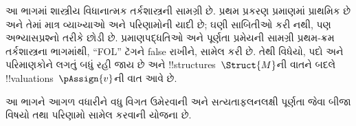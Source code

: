 \documentclass[../../include/open-logic-part]{subfiles}
\begin{document}

\begin{editorial}
  આ ભાગમાં શાસ્ત્રીય વિધાનાત્મક તર્કશાસ્ત્રની સામગ્રી છે. પ્રથમ પ્રકરણ
  પ્રમાણમાં પ્રાથમિક છે અને તેમાં માત્ર વ્યાખ્યાઓ અને પરિણામોની યાદી છે;
  ઘણી સાબિતીઓ કરી નથી, પણ અભ્યાસપ્રશ્નો તરીકે છોડી છે. પ્રમાણપદ્ધતિઓ
  અને પૂર્ણતા પ્રમેયની સામગ્રી પ્રથમ-ક્રમ તર્કશાસ્ત્રના ભાગમાંથી,
  ``FOL'' ટૅગને false રાખીને, સામેલ કરી છે. તેથી વિધેયો, પદો અને
  પરિમાણકોને લગતું બધું રહી જાય છે અને !!{structure}s~$\Struct{M}$ની
  વાતને બદલે !!{valuation}s~$\pAssign{v}$ની વાત આવે છે.

  આ ભાગને આગળ વધારીને વધુ વિગત ઉમેરવાની અને સત્યતાફલનલક્ષી પૂર્ણતા
  જેવા બીજા વિષયો તથા પરિણામો સામેલ કરવાની યોજના છે.
\end{editorial}










\OLEndPartHook
\end{document}

